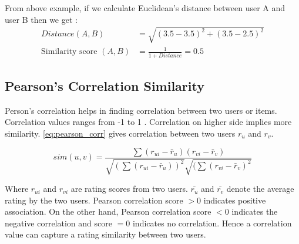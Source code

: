 \noindent From above example, if we calculate Euclidean's distance between user A and user B then we get :
\begin{align*}
Distance (A, B) &= \sqrt{(3.5 - 3.5)^{2} + (3.5 - 2.5)^{2}} \\
\textrm{Similarity score }(A,B) &= \frac{1}{1+ Distance} = 0.5
\end{align*}


\subsection{Pearson's Correlation Similarity}
\label{pearson_correlation}
Person's correlation helps in finding correlation between two users or items. Correlation values ranges from -1 to 1 \cite{20}. Correlation on higher side implies more similarity. \autoref{eq:pearson_corr} gives correlation between two users $r_{u}$ and $r_{v}$.

\begin{equation}
sim(u,v) = \frac{\sum (r_{ui} - \bar{r}_u) (r_{vi} - \bar{r}_v )}{\sqrt{(\sum (r_{ui} - \bar{r}_u))^2} \sqrt{(\sum (r_{vi} - \bar{r}_v )^2}}
\label{eq:pearson_corr}
\end{equation}

\noindent Where $r_{ui}$ and $r_{vi}$ are rating scores from two users. $\bar{r_{u}}$ and $\bar{r_{v}}$ denote the average rating by the two users.
Pearson correlation score $> 0$ indicates positive association. On the other hand, Pearson correlation score $ < 0$ indicates the negative correlation and score $ = 0$ indicates no correlation. Hence a correlation value can capture a rating similarity between two users.
